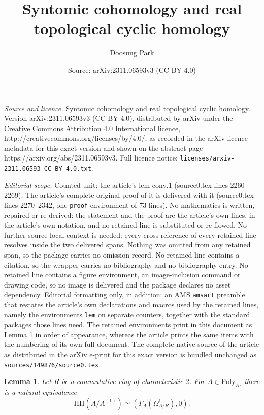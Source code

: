 \documentclass[10pt,a4paper]{amsart}
\title{Syntomic cohomology and real topological cyclic homology}
\author{Doosung Park}
\date{Source: arXiv:2311.06593v3 (CC BY 4.0)}
\newtheorem{lem}{Lemma}
\newcommand{\HH}{\mathrm{HH}}
\newcommand{\Poly}{\mathrm{Poly}}
\begin{document}
\maketitle

\noindent\emph{Source and licence.} Syntomic cohomology and real topological cyclic homology. Version arXiv:2311.06593v3 (CC BY 4.0), distributed by arXiv under the Creative Commons Attribution 4.0 International licence, http://creativecommons.org/licenses/by/4.0/, as recorded in the arXiv licence metadata for this exact version and shown on the abstract page https://arxiv.org/abs/2311.06593v3. Full licence notice: \texttt{licenses/arxiv-2311.06593-CC-BY-4.0.txt}.\par\smallskip

\noindent\textit{Editorial scope.} Counted unit: the article's lem conv.1 (source0.tex lines 2260--2269). The article's complete original proof of it is delivered with it (source0.tex lines 2270--2342, one \texttt{proof} environment of 73 lines). No mathematics is written, repaired or re-derived: the statement and the proof are the article's own lines, in the article's own notation, and no retained line is substituted or re-flowed.  No further source-local context is needed: every cross-reference of every retained line resolves inside the two delivered spans.  Nothing was omitted from any retained span, so the package carries no omission record.  No retained line contains a citation, so the wrapper carries no bibliography and no bibliography entry.  No retained line contains a figure environment, an image-inclusion command or drawing code, so no image is delivered and the package declares no asset dependency.  Editorial formatting only, in addition: an AMS \texttt{amsart} preamble that restates the article's own declarations and macros used by the retained lines, namely the environments \texttt{lem} on separate counters, together with the standard packages those lines need.  The retained environments print in this document as Lemma 1 in order of appearance, whereas the article prints the same items with the numbering of its own full document.  The complete native source of the article as distributed in the arXiv e-print for this exact version is bundled unchanged as \texttt{sources/149876/source0.tex}.
\begin{lem}
\label{conv.1}
Let $R$ be a commutative ring of characteristic $2$.
For $A\in \Poly_R$,
there is a natural equivalence
\[
\HH(A/A^{(1)})\simeq
(\Gamma_A(\Omega_{A/R}^1),0).
\]
\end{lem}
\end{document}

